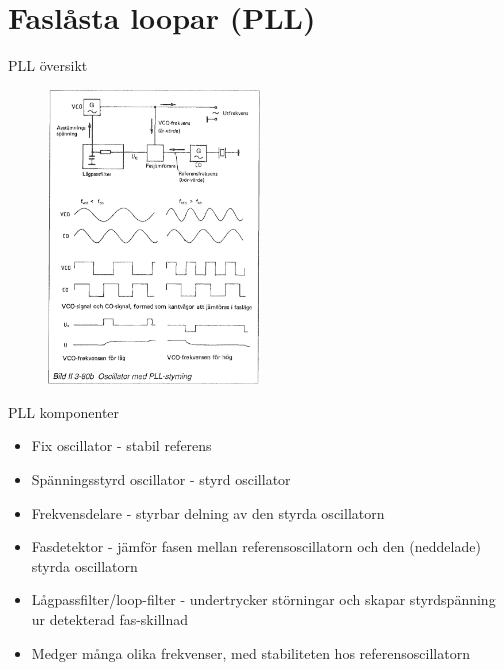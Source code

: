 \documentclass{beamer}
\begin{document}
\section{Faslåsta loopar (PLL)}

\begin{frame}{PLL översikt}

\begin{figure}[h]
\includegraphics[width=0.5\textwidth]{images/bild_2_3-80b}
\end{figure}

\end{frame}

\begin{frame}{PLL komponenter}
  \begin{itemize}
    \item Fix oscillator - stabil referens
    \item Spänningsstyrd oscillator - styrd oscillator
    \item Frekvensdelare - styrbar delning av den styrda oscillatorn
    \item Fasdetektor - jämför fasen mellan referensoscillatorn och den (neddelade) styrda oscillatorn
    \item Lågpassfilter/loop-filter - undertrycker störningar och skapar styrdspänning ur detekterad fas-skillnad
    \item Medger många olika frekvenser, med stabiliteten hos referensoscillatorn
  \end{itemize}
\end{frame}
\end{document}
